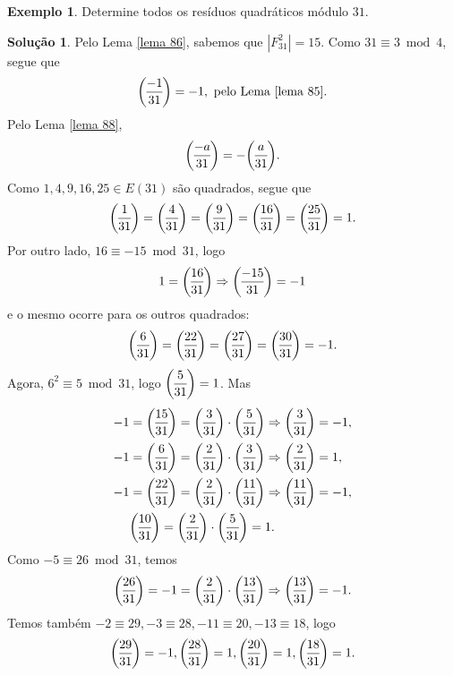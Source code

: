 \documentclass[a4paper,11pt,twoside, leqno]{article}
\newcommand{\genlegendre}[4]{%
	\genfrac{(}{)}{}{#1}{#3}{#4}%
	\if\relax\detokenize{#2}\relax\else_{\!#2}\fi
}
\newcommand{\legendre}[3][]{\genlegendre{}{#1}{#2}{#3}}
\theoremstyle{definition}
\newtheorem*{example}{Exemplo}
\newtheorem*{solution}{Solução}
\begin{document}
\begin{example}
	Determine todos os resíduos quadráticos módulo $31$.
\end{example}
\begin{solution}
	Pelo Lema \eqref{lema 86}, sabemos que $\left| F_{31}^2 \right| = 15$. Como $31\equiv 3\bmod 4$, segue que 
	\begin{align*}
	\legendre[]{-1}{31} = -1, \text{ pelo Lema \eqref{lema 85}}.
	\end{align*}
	Pelo Lema \eqref{lema 88}, 
	\begin{align*}
	\legendre[]{-a}{31} = -\legendre[]{a}{31}.
	\end{align*}
	Como $1,4,9,16,25\in E(31)$ são quadrados, segue que
	\begin{align*}
	\legendre[]{1}{31} = \legendre[]{4}{31} = \legendre[]{9}{31} = \legendre[]{16}{31} = \legendre[]{25}{31} = 1.
	\end{align*}
	Por outro lado, $16\equiv -15\bmod 31$, logo
	\begin{align*}
	1 = \legendre[]{16}{31} \Rightarrow \legendre[]{-15}{31} = -1
	\end{align*}
	e o mesmo ocorre para os outros quadrados:
	\begin{align*}
	\legendre[]{6}{31} = \legendre[]{22}{31} = \legendre[]{27}{31} = \legendre[]{30}{31} = -1.
	\end{align*}
	Agora, $6^2\equiv 5\bmod 31$, logo $\displaystyle{\legendre[]{5}{31} = 1}$. Mas
	\begin{align*}
	-1 &= \legendre[]{15}{31} = \legendre[]{3}{31}\cdot\legendre[]{5}{31} \Rightarrow \legendre[]{3}{31} = -1, \\
	-1 &= \legendre[]{6}{31} = \legendre[]{2}{31}\cdot\legendre[]{3}{31} \Rightarrow \legendre[]{2}{31} = 1, \\
	-1 &= \legendre[]{22}{31} = \legendre[]{2}{31}\cdot\legendre[]{11}{31} \Rightarrow \legendre[]{11}{31} = -1, \\
	&\legendre[]{10}{31} = \legendre[]{2}{31}\cdot\legendre[]{5}{31} = 1.
	\end{align*}
	Como $-5\equiv 26\bmod 31$, temos
	\begin{align*}
	\legendre[]{26}{31} = -1 = \legendre[]{2}{31}\cdot\legendre[]{13}{31} \Rightarrow \legendre[]{13}{31} = -1.
	\end{align*}
	Temos também $-2\equiv 29, -3\equiv 28, -11\equiv 20, -13\equiv 18$, logo
	\begin{align*}
	\legendre[]{29}{31} = -1, \legendre[]{28}{31} = 1, \legendre[]{20}{31} = 1, \legendre[]{18}{31} = 1.

\end{align*}
\end{solution}
\end{document}
